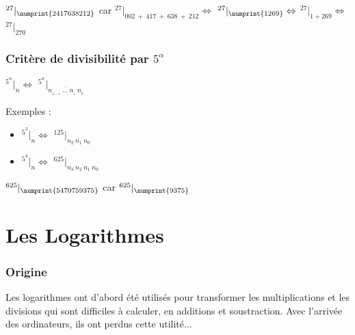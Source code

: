 \documentclass[a4paper, twoside]{article}
\begin{document}
	{\Large $^{27}|_{\numprint{2417638212}}$} car {\Large $^{27}|_{002~+~417~+~638~+~212} \Leftrightarrow$ $^{27}|_{\numprint{1269}} \Leftrightarrow$ $^{27}|_{1 + 269} \Leftrightarrow$ $^{27}|_{270}$}

	\vfill
	{\noindent \dotfill}

	\subsubsection*{Critère de divisibilité par $5^\alpha$}

	\begin{center}
		\huge
		$ ^{5^{\alpha}}|_n \Leftrightarrow$ $^{5^{\alpha}}|_{\overline{n_{_{\alpha-1}}~\dots~n_{_1}~n_{_0}}} $
	\end{center}


	Exemples :

	\begin{Large}
	\begin{itemize}

		\item[] $ ^{5^{3}}|_n \Leftrightarrow$ $^{125}|_{\overline{n_2~n_1~n_0}} $
		\item[] $ ^{5^{4}}|_n \Leftrightarrow$ $^{625}|_{\overline{n_3~n_2~n_1~n_0}} $\\

	\end{itemize}
	\end{Large}

	{\Large $^{625}|_{\numprint{5470759375}}$} car {\Large $^{625}|_{\numprint{9375}}$ }


	\vfill

	\newpage


















	\section{Les Logarithmes} \label{intro_log}
	\subsubsection*{Origine}

		Les logarithmes ont d'abord été utilisés pour transformer les multiplications et les divisions qui sont difficiles à calculer, en additions et soustraction. Avec l'arrivée des ordinateurs, ils ont perdus cette utilité...
		
\end{document}
